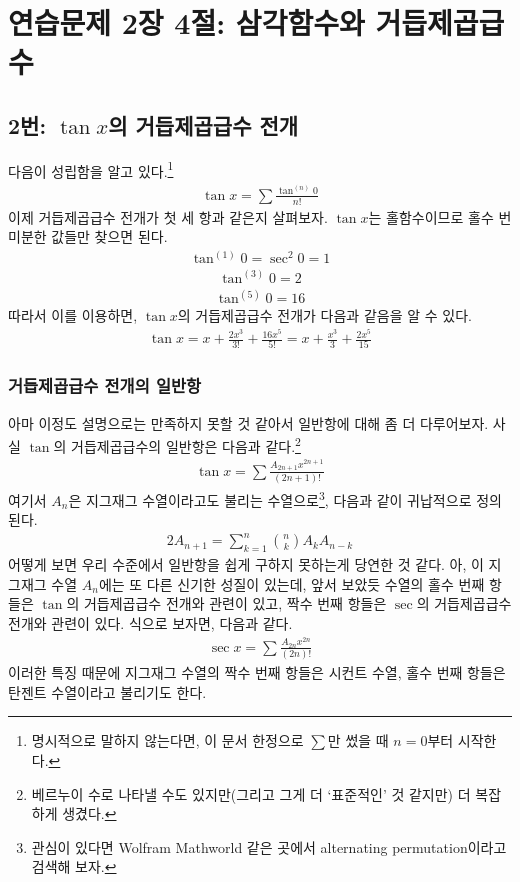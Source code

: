 \section{연습문제 2장 4절: 삼각함수와 거듭제곱급수}

\subsection{2번: $\tan x$의 거듭제곱급수 전개}
다음이 성립함을 알고 있다.\footnote{명시적으로 말하지 않는다면, 이 문서 한정으로 $\sum$만 썼을 때 $n=0$부터 시작한다.}
\begin{align*}
\tan x=\sum \frac{\tan^{(n)}0}{n!}
\end{align*}
이제 거듭제곱급수 전개가 첫 세 항과 같은지 살펴보자. $\tan x$는 홀함수이므로 홀수 번 미분한 값들만 찾으면 된다.
\begin{align*}
\tan^{(1)} 0=\sec^2 0=1
\end{align*}
\begin{align*}
\tan^{(3)} 0=2
\end{align*}
\begin{align*}
\tan^{(5)} 0=16
\end{align*}
따라서 이를 이용하면, $\tan x$의 거듭제곱급수 전개가 다음과 같음을 알 수 있다.
\begin{align*}
\tan x=x+\frac{2x^3}{3!}+\frac{16x^5}{5!}=x+\frac{x^3}{3}+\frac{2x^5}{15}
\end{align*}

\subsubsection{거듭제곱급수 전개의 일반항}
아마 이정도 설명으로는 만족하지 못할 것 같아서 일반항에 대해 좀 더 다루어보자. 사실 $\tan$의 거듭제곱급수의 일반항은 다음과 같다.\footnote{베르누이 수로 나타낼 수도 있지만(그리고 그게 더 `표준적인' 것 같지만) 더 복잡하게 생겼다.}
\begin{align*}
\tan x=\sum\frac{A_{2n+1}x^{2n+1}}{(2n+1)!}
\end{align*}
여기서 $A_n$은 지그재그 수열이라고도 불리는 수열으로\footnote{관심이 있다면 Wolfram Mathworld 같은 곳에서 alternating permutation이라고 검색해 보자.}, 다음과 같이 귀납적으로 정의된다.
\begin{align*}
2A_{n+1}=\sum^n_{k=1}{n\choose k}A_kA_{n-k}
\end{align*}
어떻게 보면 우리 수준에서 일반항을 쉽게 구하지 못하는게 당연한 것 같다. 아, 이 지그재그 수열 $A_n$에는 또 다른 신기한 성질이 있는데, 앞서 보았듯 수열의 홀수 번째 항들은 $\tan$의 거듭제곱급수 전개와 관련이 있고, 짝수 번째 항들은 $\sec$의 거듭제곱급수 전개와 관련이 있다. 식으로 보자면, 다음과 같다.
\begin{align*}
\sec x=\sum\frac{A_{2n}x^{2n}}{(2n)!}
\end{align*}
이러한 특징 때문에 지그재그 수열의 짝수 번째 항들은 시컨트 수열, 홀수 번째 항들은 탄젠트 수열이라고 불리기도 한다.


